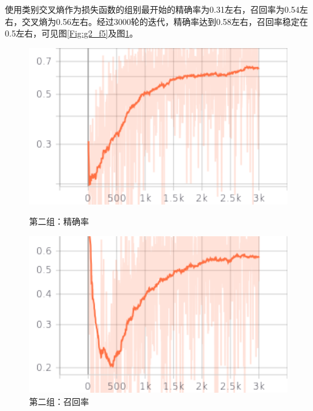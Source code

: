 使用类别交叉熵作为损失函数的组别最开始的精确率为0.31左右，召回率为0.54左右，交叉熵为0.56左右。经过3000轮的迭代，精确率达到0.58左右，召回率稳定在0.5左右，可见图\ref{Fig:g2_f5}及图\ref{Fig:g2_f6}。

\begin{figure}[htbp]
    
    \centering
    \begin{minipage}[t]{0.49\textwidth}
        \centering
        \includegraphics[width=1\textwidth]{Figures/图表/类别平衡交叉熵/precision.png}
        \caption{第二组：精确率}
        \label{Fig:g2_f5}
    \end{minipage}
    \begin{minipage}[t]{0.49\textwidth}
        \centering
        \includegraphics[width=1\textwidth]{Figures/图表/类别平衡交叉熵/recall.png}
        \caption{第二组：召回率}
        \label{Fig:g2_f6}
    \end{minipage}
    
\end{figure}
